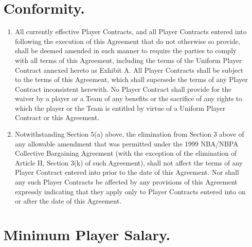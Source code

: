 \documentclass[
]{book}
\providecommand{\tightlist}{%
  \setlength{\itemsep}{0pt}\setlength{\parskip}{0pt}}
\begin{document}
\hypertarget{conformity.}{%
\section{Conformity.}\label{conformity.}}

\begin{enumerate}
\def\labelenumi{(\alph{enumi})}
\tightlist
\item
  All currently effective Player Contracts, and all Player Contracts entered into following the execution of this Agreement that do not otherwise so provide, shall be deemed amended in such manner to require the parties to comply with all terms of this Agreement, including the terms of the Uniform Player Contract annexed hereto as Exhibit A. All Player Contracts shall be subject to the terms of this Agreement, which shall supersede the terms of any Player Contract inconsistent herewith. No Player Contract shall provide for the waiver by a player or a Team of any benefits or the sacrifice of any rights to which the player or the Team is entitled by virtue of a Uniform Player Contract or this Agreement.
\item
  Notwithstanding Section 5(a) above, the elimination from Section 3 above of any allowable amendment that was permitted under the 1999 NBA/NBPA Collective Bargaining Agreement (with the exception of the elimination of Article II, Section 3(k) of such Agreement), shall not affect the terms of any Player Contract entered into prior to the date of this Agreement. Nor shall any such Player Contracts be affected by any provisions of this Agreement expressly indicating that they apply only to Player Contracts entered into on or after the date of this Agreement.
\end{enumerate}

\hypertarget{minimum-player-salary.}{%
\section{Minimum Player Salary.}\label{minimum-player-salary.}}
\end{document}
